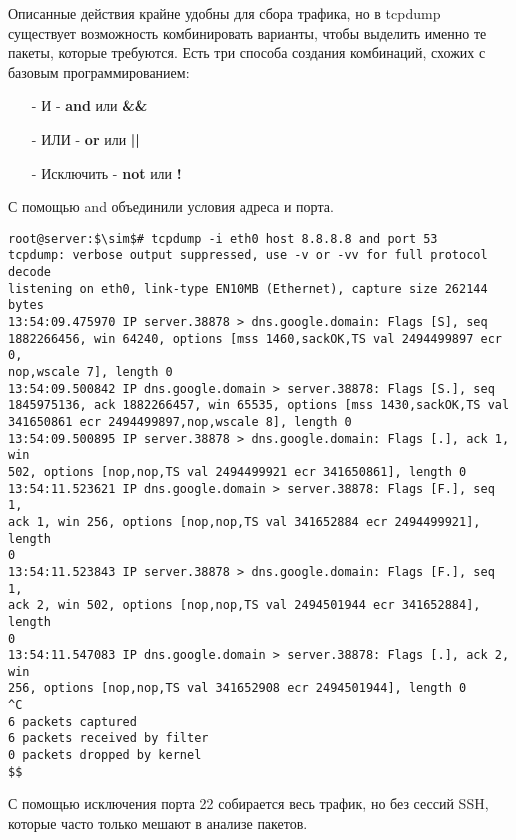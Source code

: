 \documentclass[14pt, a4paper]{article}
\begin{document}
Описанные действия крайне удобны для сбора трафика, но в tcpdump существует возможность
комбинировать варианты, чтобы выделить именно те пакеты, которые требуются. Есть три способа
создания комбинаций, схожих с базовым программированием:
\begin{itemize}
    \item[-] И - \textbf{and} или \textbf{\&\&}
    \item[-] ИЛИ - \textbf{or} или \textbf{||}
    \item[-] Исключить - \textbf{not} или \textbf{!}
\end{itemize}

С помощью \colorbox{backcolour}{and} объединили условия адреса и порта.

\vspace{0.3cm}
\begin{lstlisting}
root@server:$\sim$# tcpdump -i eth0 host 8.8.8.8 and port 53
tcpdump: verbose output suppressed, use -v or -vv for full protocol decode
listening on eth0, link-type EN10MB (Ethernet), capture size 262144 bytes
13:54:09.475970 IP server.38878 > dns.google.domain: Flags [S], seq 
1882266456, win 64240, options [mss 1460,sackOK,TS val 2494499897 ecr 0,
nop,wscale 7], length 0
13:54:09.500842 IP dns.google.domain > server.38878: Flags [S.], seq 
1845975136, ack 1882266457, win 65535, options [mss 1430,sackOK,TS val 
341650861 ecr 2494499897,nop,wscale 8], length 0
13:54:09.500895 IP server.38878 > dns.google.domain: Flags [.], ack 1, win 
502, options [nop,nop,TS val 2494499921 ecr 341650861], length 0
13:54:11.523621 IP dns.google.domain > server.38878: Flags [F.], seq 1, 
ack 1, win 256, options [nop,nop,TS val 341652884 ecr 2494499921], length 
0
13:54:11.523843 IP server.38878 > dns.google.domain: Flags [F.], seq 1, 
ack 2, win 502, options [nop,nop,TS val 2494501944 ecr 341652884], length 
0
13:54:11.547083 IP dns.google.domain > server.38878: Flags [.], ack 2, win 
256, options [nop,nop,TS val 341652908 ecr 2494501944], length 0
^C
6 packets captured
6 packets received by filter
0 packets dropped by kernel
$$
\end{lstlisting}
\vspace{0.2cm}

С помощью исключения порта 22 собирается весь трафик, но без сессий SSH, которые часто только
мешают в анализе пакетов.
\end{document}
